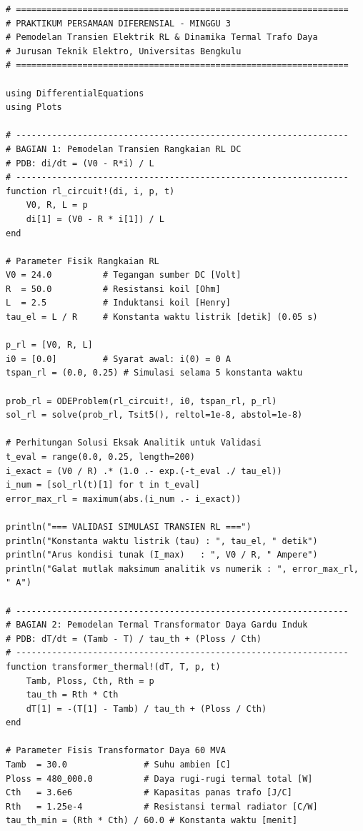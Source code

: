 \documentclass[11pt,a4paper]{article}
\theoremstyle{definition}
\begin{document}
\begin{lstlisting}[style=juliastyle, caption={Skrip Julia untuk Pemodelan Transien Elektromagnetik dan Dinamika Termal Trafo.}, label={lst:julia_transient_sim}]
# =================================================================
# PRAKTIKUM PERSAMAAN DIFERENSIAL - MINGGU 3
# Pemodelan Transien Elektrik RL & Dinamika Termal Trafo Daya
# Jurusan Teknik Elektro, Universitas Bengkulu
# =================================================================

using DifferentialEquations
using Plots

# -----------------------------------------------------------------
# BAGIAN 1: Pemodelan Transien Rangkaian RL DC
# PDB: di/dt = (V0 - R*i) / L
# -----------------------------------------------------------------
function rl_circuit!(di, i, p, t)
    V0, R, L = p
    di[1] = (V0 - R * i[1]) / L
end

# Parameter Fisik Rangkaian RL
V0 = 24.0          # Tegangan sumber DC [Volt]
R  = 50.0          # Resistansi koil [Ohm]
L  = 2.5           # Induktansi koil [Henry]
tau_el = L / R     # Konstanta waktu listrik [detik] (0.05 s)

p_rl = [V0, R, L]
i0 = [0.0]         # Syarat awal: i(0) = 0 A
tspan_rl = (0.0, 0.25) # Simulasi selama 5 konstanta waktu

prob_rl = ODEProblem(rl_circuit!, i0, tspan_rl, p_rl)
sol_rl = solve(prob_rl, Tsit5(), reltol=1e-8, abstol=1e-8)

# Perhitungan Solusi Eksak Analitik untuk Validasi
t_eval = range(0.0, 0.25, length=200)
i_exact = (V0 / R) .* (1.0 .- exp.(-t_eval ./ tau_el))
i_num = [sol_rl(t)[1] for t in t_eval]
error_max_rl = maximum(abs.(i_num .- i_exact))

println("=== VALIDASI SIMULASI TRANSIEN RL ===")
println("Konstanta waktu listrik (tau) : ", tau_el, " detik")
println("Arus kondisi tunak (I_max)   : ", V0 / R, " Ampere")
println("Galat mutlak maksimum analitik vs numerik : ", error_max_rl, " A")

# -----------------------------------------------------------------
# BAGIAN 2: Pemodelan Termal Transformator Daya Gardu Induk
# PDB: dT/dt = (Tamb - T) / tau_th + (Ploss / Cth)
# -----------------------------------------------------------------
function transformer_thermal!(dT, T, p, t)
    Tamb, Ploss, Cth, Rth = p
    tau_th = Rth * Cth
    dT[1] = -(T[1] - Tamb) / tau_th + (Ploss / Cth)
end

# Parameter Fisis Transformator Daya 60 MVA
Tamb  = 30.0               # Suhu ambien [C]
Ploss = 480_000.0          # Daya rugi-rugi termal total [W]
Cth   = 3.6e6              # Kapasitas panas trafo [J/C]
Rth   = 1.25e-4            # Resistansi termal radiator [C/W]
tau_th_min = (Rth * Cth) / 60.0 # Konstanta waktu [menit]


\end{lstlisting}
\end{document}
